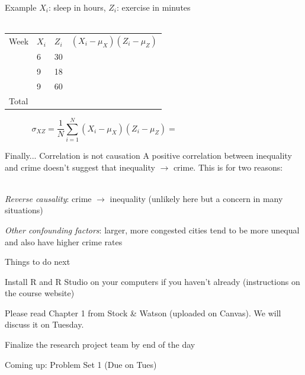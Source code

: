 \documentclass{./../div_teaching_slides}
\begin{document}
\begin{frame}{Example}
\vspace{-0.25em}
$X_i$: sleep in hours, $Z_i$: exercise in minutes \\~\\
\begin{tabularx}{1\textwidth}{P{1.5cm}P{1.5cm}P{1.5cm}Y}
\hline \addlinespace[0.5em]
Week & $X_i$ & $Z_i$ & $(X_i-\mu_X)(Z_i-\mu_Z)$   \\ \addlinespace[0.5em] \hline {} & 6 & 30 &    \\ \hline {} & 9 & 18 &    \\ \hline {} & 9 & 60 &    \\ \hline \addlinespace[0.5em]
 Total & & & \\
 \hline 
\end{tabularx} 
$$ \sigma_{XZ} = \frac{1}{N}\sum_{i=1}^N (X_i-\mu_X)(Z_i-\mu_Z) = \hspace{5cm} $$
\end{frame}


\begin{frame}{Finally... Correlation is not causation}
A positive correlation between inequality and crime doesn't suggest that inequality $\rightarrow$ crime. This is for two reasons: \\~\\
\begin{witemize}
  \item \textit{Reverse causality}: crime $\rightarrow$ inequality (unlikely here but a concern in many situations)
  \item \textit{Other confounding factors}: larger, more congested cities tend to be more unequal and also have higher crime rates
\end{witemize}
\end{frame}


\begin{frame}{Things to do next}
\begin{witemize}
\item Install R and R Studio on your computers if you haven't already (instructions on the course website)
\item Please read Chapter 1 from Stock \& Watson (uploaded on Canvas). We will discuss it on Tuesday. 
\item Finalize the research project team by end of the day
\item Coming up: Problem Set 1 (Due on Tues)
\end{witemize}
\end{frame}
\end{document}

